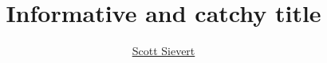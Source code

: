 \documentclass{article}
\title{Informative and catchy title}
\author{\href{http://stsievert.com}{Scott Sievert}}
\begin{document}
\maketitle



{}

\end{document}
